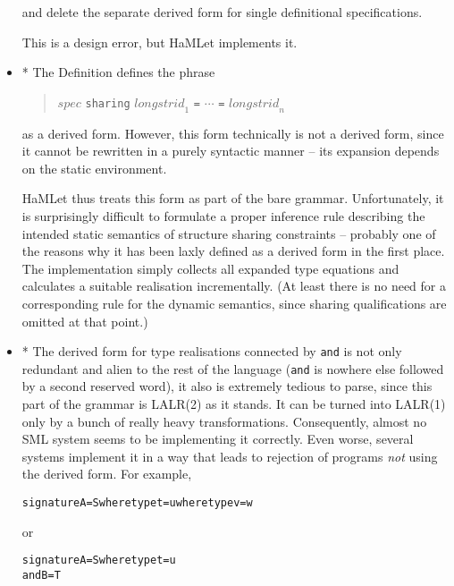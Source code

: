 \documentclass[twoside,titlepage]{article}
\begin{document}
\begin{appendix}
\begin{itemize}
and delete the separate derived form for single definitional specifications.

This is a design error, but HaMLet implements it.

\item * The Definition defines the phrase

\begin{quote}
$\mathit{spec}$ {\tt sharing} $\mathit{longstrid}_1$ {\tt =} $\cdots$ {\tt =} $\mathit{longstrid}_n$
\end{quote}

as a derived form. However, this form technically is not a derived form, since it cannot be rewritten in a purely syntactic manner -- its expansion depends on the static environment.

HaMLet thus treats this form as part of the bare grammar. Unfortunately, it is surprisingly difficult to formulate a proper inference rule describing the intended static semantics of structure sharing constraints -- probably one of the reasons why it has been laxly defined as a derived form in the first place. The implementation simply collects all expanded type equations and calculates a suitable realisation incrementally. (At least there is no need for a corresponding rule for the dynamic semantics, since sharing qualifications are omitted at that point.)

\item * The derived form for type realisations connected by {\tt and} is not only redundant and alien to the rest of the language ({\tt and} is nowhere else followed by a second reserved word), it also is extremely tedious to parse, since this part of the grammar is LALR(2) as it stands. It can be turned into LALR(1) only by a bunch of really heavy transformations. Consequently, almost no SML system seems to be implementing it correctly. Even worse, several systems implement it in a way that leads to rejection of programs {\em not} using the derived form. For example,

\begin{quoting}
\begin{alltt}
signature A = S where type t = u where type v = w
\end{alltt}
\end{quoting}

or

\begin{quoting}
\begin{alltt}
signature A = S where type t = u
and       B = T
\end{alltt}
\end{quoting}


\end{itemize}
\end{appendix}
\end{document}
